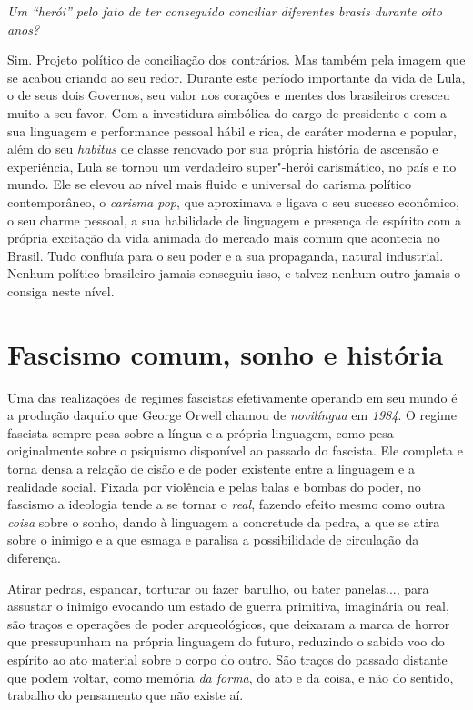 \medskip

\noindent\emph{Um ``herói'' pelo fato de ter conseguido conciliar diferentes brasis
durante oito anos?}

\noindent Sim. Projeto político de conciliação dos contrários. Mas também pela
imagem que se acabou criando ao seu redor. Durante este período
importante da vida de Lula, o de seus dois Governos, seu valor nos
corações e mentes dos brasileiros cresceu muito a seu favor. Com a
investidura simbólica do cargo de presidente e com a sua linguagem e
performance pessoal hábil e rica, de caráter moderna e popular, além do
seu \emph{habitus} de classe renovado por sua própria história de
ascensão e experiência, Lula se tornou um verdadeiro super"-herói
carismático, no país e no mundo. Ele se elevou ao nível mais fluido e
universal do carisma político contemporâneo, o \emph{carisma pop}, que
aproximava e ligava o seu sucesso econômico, o seu charme pessoal, a sua
habilidade de linguagem e presença de espírito com a própria excitação
da vida animada do mercado mais comum que acontecia no Brasil. Tudo
confluía para o seu poder e a sua propaganda, natural industrial. Nenhum
político brasileiro jamais conseguiu isso, e talvez nenhum outro jamais
o consiga neste nível.

\chapter{Fascismo comum, sonho e história}

Uma das realizações de regimes fascistas efetivamente operando em seu
mundo é a produção daquilo que George Orwell chamou de \emph{novilíngua}
em \emph{1984}. O regime fascista sempre pesa sobre a
língua e a própria linguagem, como pesa originalmente sobre o psiquismo
disponível ao passado do fascista. Ele completa e torna densa a relação
de cisão e de poder existente entre a linguagem e a realidade social.
Fixada por violência e pelas balas e bombas do poder, no fascismo a
ideologia tende a se tornar o \emph{real}, fazendo efeito mesmo como
outra \emph{coisa} sobre o sonho, dando à linguagem a concretude da
pedra, a que se atira sobre o inimigo e a que esmaga e paralisa a
possibilidade de circulação da diferença.

Atirar pedras, espancar, torturar ou fazer barulho, ou bater panelas...,
para assustar o inimigo evocando um estado de guerra primitiva,
imaginária ou real, são traços e operações de poder arqueológicos, que
deixaram a marca de horror que pressupunham na própria linguagem do
futuro, reduzindo o sabido voo do espírito ao ato material sobre o corpo
do outro. São traços do passado distante que podem voltar, como memória
\emph{da forma}, do ato e da coisa, e não do sentido, trabalho do
pensamento que não existe aí.

